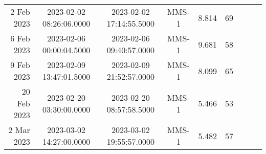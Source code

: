 \begin{longtable}{r|cccccccc}
2 Feb 2023     &  2023-02-02 08:26:06.0000 &  2023-02-02 17:14:55.5000 &  MMS-1 &    8.814 &     69 \\
6 Feb 2023     &  2023-02-06 00:00:04.5000 &  2023-02-06 09:40:57.0000 &  MMS-1 &    9.681 &     58 \\
9 Feb 2023     &  2023-02-09 13:47:01.5000 &  2023-02-09 21:52:57.0000 &  MMS-1 &    8.099 &     65 \\
20 Feb 2023    &  2023-02-20 03:30:00.0000 &  2023-02-20 08:57:58.5000 &  MMS-1 &    5.466 &     53 \\
2 Mar 2023     &  2023-03-02 14:27:00.0000 &  2023-03-02 19:55:57.0000 &  MMS-1 &    5.482 &     57 \\
\hline
\end{longtable}
